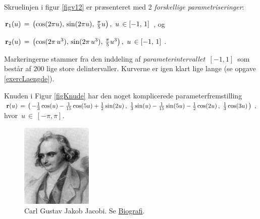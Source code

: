 \begin{example}[Skruelinje] \label{exSkruelinje}
{Skruelinjen} i figur \ref{figv12} er præsenteret med 2
\emph{forskellige parametriseringer}: \begin{center} ${\bf r}_{1}(u) \, =
\, \left(\cos(2\pi u), \,\sin(2\pi u),\, \frac{\pi}{5}u\right), \,
\, u \, \in [-1,\, 1]\, \, $, og \end{center}
\begin{center} ${\bf r}_{2}(u) \, = \, \left(\cos(2\pi\, u^{3}),
\,\sin(2\pi\, u^{3}),\, \frac{\pi}{5}u^{3} \right), \, \, u \, \in
[-1,\, 1]\, $.
\end{center} Markeringerne stammer fra den inddeling af {\em
parameterintervallet $\, [-1, 1]\,$} som består af $200$ lige store
delintervaller. Kurverne er igen klart lige lange (se opgave
\ref{exercLaengde}).
\end{example}




\begin{example}[Knude] \label{exKnude}
{{Knuden}} i Figur \ref{figKnude} har den noget
komplicerede parameterfremstilling
\newline ${\bf r}(u) \, = \, \left(\, -\frac{1}{3}\cos(u) -
\frac{1}{15}\cos(5u) + \frac{1}{2}\sin(2u)\, , \, \,
\frac{1}{3}\sin(u) - \frac{1}{15}\sin(5u)-\frac{1}{2}\cos(2u)\,  ,
\, \, \frac{1}{3}\cos(3u) \, \right)\, \,  ,$ \newline hvor $\, u \,
\in \, [-\pi, \pi]$.
\end{example}

\begin{figure}[t]
\centerline{\includegraphics[height=40mm]{FIGS/PERSJacobi_3}}
\begin{center}
\caption{\small{Carl Gustav Jakob Jacobi. Se  \href{http://www-groups.dcs.st-and.ac.uk/~history/Mathematicians/Jacobi.html}{Biografi}.}} \label{figJacobi}
\end{center}
\end{figure}



